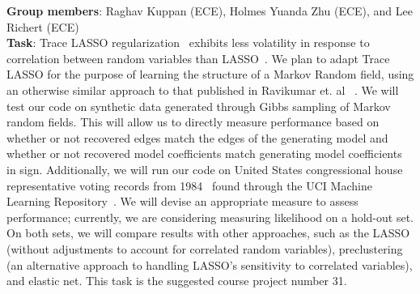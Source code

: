 \documentclass{article}
\begin{document}
\textbf{Group members}: Raghav Kuppan (ECE), Holmes Yuanda Zhu (ECE), and Lee Richert (ECE)\\

\textbf{Task}: Trace LASSO regularization~\cite{grave2011trace} exhibits less volatility in response to correlation between random variables than LASSO~\cite{tibshirani1996regression}.  We plan to adapt Trace LASSO for the purpose of learning the structure of a Markov Random field, using an otherwise similar approach to that published in Ravikumar et. al ~\cite{ravikumar2010high}. We will test our code on synthetic data generated through Gibbs sampling of Markov random fields. This will allow us to directly measure performance based on whether or not recovered edges match the edges of the generating model and whether or not recovered model coefficients match generating model coefficients in sign.  Additionally, we will run our code on United States congressional house representative voting records from 1984~\cite{schlimmer1987concept} found through the UCI Machine Learning Repository~\cite{bache2013uci}. We will devise an appropriate measure to assess performance; currently, we are considering measuring likelihood on a hold-out set. On both sets, we will compare results with other approaches, such as the LASSO  (without adjustments to account for correlated random variables), preclustering (an alternative approach to handling LASSO's sensitivity to correlated variables), and elastic net. This task is the suggested course project number 31.\\
{}

\end{document}
